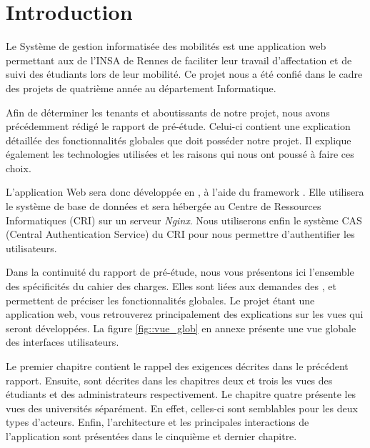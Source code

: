 \chapter*{Introduction}


Le Système de gestion informatisée des mobilités est une application web permettant aux \ris de l'INSA de Rennes de faciliter leur travail d'affectation et de suivi des étudiants lors de leur mobilité. Ce projet nous a été confié dans le cadre des projets de quatrième année au département Informatique.

\bigbreak

Afin de déterminer les tenants et aboutissants de notre projet, nous avons précédemment rédigé le rapport de pré-étude. Celui-ci contient une explication détaillée des fonctionnalités globales que doit posséder notre projet. Il explique également les technologies utilisées et les raisons qui nous ont poussé à faire ces choix. 

L'application Web sera donc développée en \php, à l'aide du framework \symfony. Elle utilisera le système de base de données \mdb et sera hébergée au Centre de Ressources Informatiques (CRI) sur un serveur \textit{Nginx}. Nous utiliserons enfin le système CAS (Central Authentication Service) du CRI pour nous permettre d'authentifier les utilisateurs.

\bigbreak

Dans la continuité du rapport de pré-étude, nous vous présentons ici l'ensemble des spécificités du cahier des charges. Elles sont liées aux demandes des \ris, et permettent de préciser les fonctionnalités globales. Le projet étant une application web, vous retrouverez principalement des explications sur les vues qui seront développées. La figure \ref{fig::vue_glob} en annexe présente une vue globale des interfaces utilisateurs.

Le premier chapitre contient le rappel des exigences décrites dans le précédent rapport. Ensuite, sont décrites dans les chapitres deux et trois les vues des étudiants et des administrateurs respectivement. Le chapitre quatre présente les vues des universités séparément. En effet, celles-ci sont semblables pour les deux types d'acteurs. Enfin, l'architecture et les principales interactions de l'application sont présentées dans le cinquième et dernier chapitre.
